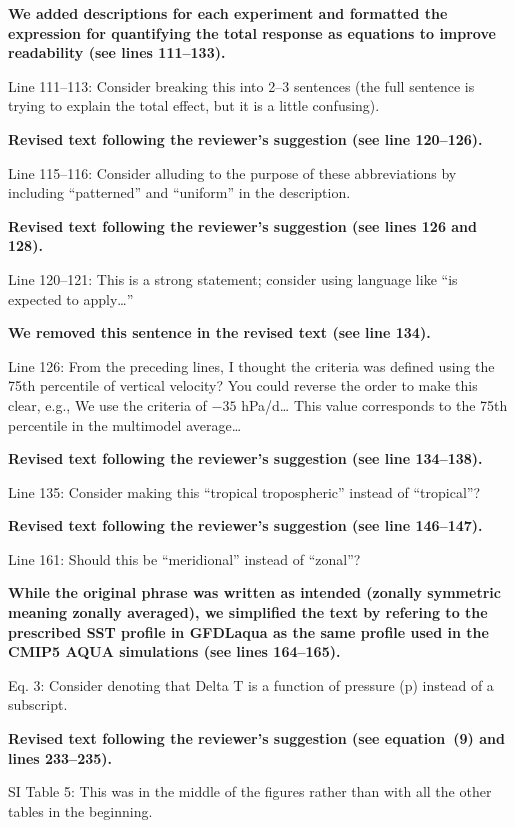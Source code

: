 \documentclass[11pt]{article}
\begin{document}
\textbf{We added descriptions for each experiment and formatted the expression for quantifying the total response as equations to improve readability (see lines 111--133).}

Line 111--113: Consider breaking this into 2--3 sentences (the full sentence is trying to explain the total effect, but it is a little confusing).

\textbf{Revised text following the reviewer's suggestion (see line 120--126).}

Line 115--116: Consider alluding to the purpose of these abbreviations by including ``patterned'' and ``uniform'' in the description.

\textbf{Revised text following the reviewer's suggestion (see lines 126 and 128).}

Line 120--121: This is a strong statement; consider using language like ``is expected to apply\ldots{}''

\textbf{We removed this sentence in the revised text (see line 134).}

Line 126: From the preceding lines, I thought the criteria was defined using the 75th percentile of vertical velocity? You could reverse the order to make this clear, e.g., We use the criteria of \(-35\) hPa/d\ldots{} This value corresponds to the 75th percentile in the multimodel average\ldots{}

\textbf{Revised text following the reviewer's suggestion (see line 134--138).}

Line 135: Consider making this ``tropical tropospheric'' instead of ``tropical''?

\textbf{Revised text following the reviewer's suggestion (see line 146--147).}

Line 161: Should this be ``meridional'' instead of ``zonal''?

\textbf{While the original phrase was written as intended (zonally symmetric meaning zonally averaged), we simplified the text by refering to the prescribed SST profile in GFDLaqua as the same profile used in the CMIP5 AQUA simulations (see lines 164--165).}

Eq. 3: Consider denoting that Delta T is a function of pressure (p) instead of a subscript.

\textbf{Revised text following the reviewer's suggestion (see equation~(9) and lines 233--235).}

SI Table 5: This was in the middle of the figures rather than with all the other tables in the beginning.
\end{document}
